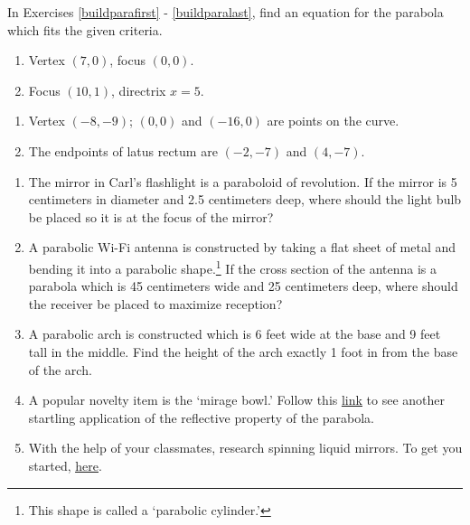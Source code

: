 In Exercises \ref{buildparafirst} - \ref{buildparalast}, find an equation for the parabola which fits the given criteria.

\begin{multicols}{2}
\begin{enumerate}
\setcounter{enumi}{\value{HW}}

\item Vertex $(7, 0)$, focus $(0, 0)$. \label{buildparafirst}
\item Focus $(10, 1)$, directrix $x = 5$.


\setcounter{HW}{\value{enumi}}
\end{enumerate}
\end{multicols}

\begin{enumerate}
\setcounter{enumi}{\value{HW}}


\item Vertex $(-8, -9)$; $(0, 0)$ and $(-16, 0)$ are points on the curve.
\item The endpoints of latus rectum are $(-2, -7)$ and $(4, -7)$.\label{buildparalast}

\setcounter{HW}{\value{enumi}}
\end{enumerate}





\begin{enumerate}
\setcounter{enumi}{\value{HW}}

\item  The mirror in Carl's flashlight is a paraboloid of revolution.  If the mirror is 5 centimeters in diameter and 2.5 centimeters deep, where should the light bulb be placed so it is at the focus of the mirror?

\item  A parabolic Wi-Fi antenna is constructed by taking a flat sheet of metal and bending it into a parabolic shape.\footnote{This shape is called a `parabolic cylinder.'}  If the cross section of the antenna is a parabola which is 45 centimeters wide and 25 centimeters deep, where should the receiver be placed to maximize reception?

\item  \label{parabolaarch} A parabolic arch is constructed which is 6 feet wide at the base and 9 feet tall in the middle. Find the height of the arch exactly 1 foot in from the base of the arch. 

\item  A popular novelty item is the `mirage bowl.'  Follow this  \href{http://spie.org/etop/2007/etop07methodsV.pdf}{\underline{link}} to see another startling application of the reflective property of the parabola.

\item With the help of your classmates, research spinning liquid mirrors.  To get you started,  \href{http://www.astro.ubc.ca/LMT/lzt/}{\underline{here}}.

\end{enumerate}


